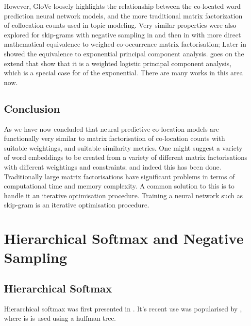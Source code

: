 \documentclass[parskip]{komatufte}
\begin{document}
However, GloVe loosely highlights the relationship between the co-located word prediction neural network models,
and the more traditional matrix factorization of collocation counts used in topic modeling.
Very similar properties were also explored for skip-grams with negative sampling in  and then in  with more direct mathematical equivalence to weighed co-occurrence matrix factorisation;
Later in  showed the equivalence to exponential principal component analysis.
 goes on the extend that show that it is a weighted logistic principal component analysis, which is a special case for of the exponential.
There are many works in this area now.


\subsection{Conclusion}
As we have now concluded that neural predictive co-location models are functionally very similar to matrix factorisation of co-location counts with suitable weightings, and suitable similarity metrics.
One might suggest a variety of word embeddings to be created from a variety of different matrix factorisations with different weightings and constraints; and indeed this has been done.
Traditionally large matrix factorisations have significant problems in terms of computational time and memory complexity.
A common solution to this is to handle it an iterative optimisation procedure.
Training a neural network such as skip-gram is an iterative optimisation procedure.




\section{Hierarchical Softmax and Negative Sampling}\label{sec:hierachical-softmax-and-negative-sampling}

\subsection{Hierarchical Softmax}
Hierarchical softmax was first presented in  .
It's recent use was popularised by , where is is used using a huffman tree.
\end{document}
